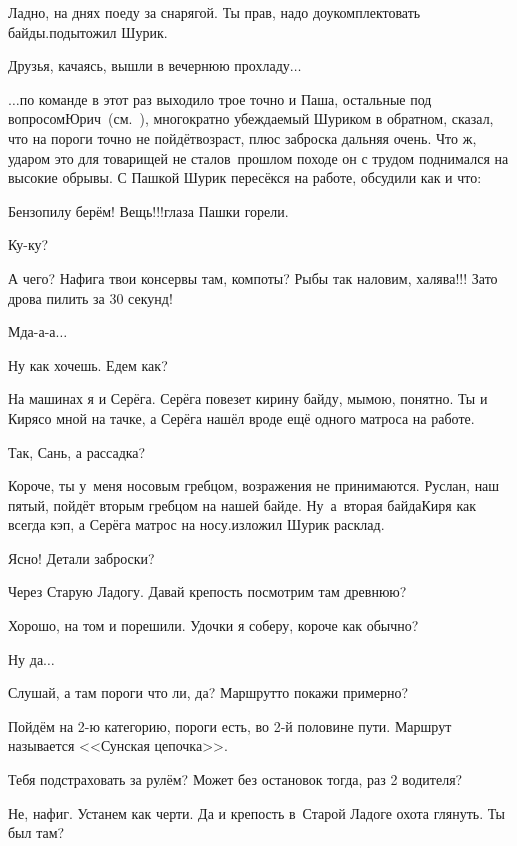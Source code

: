 \diagdash Ладно, на днях поеду за снарягой. Ты прав, надо доукомплектовать байды.\mdash подытожил Шурик.

Друзья, качаясь, вышли в вечернюю прохладу$\ldots$

\vspace{0.5cm}

$\ldots$по команде в этот раз выходило трое точно и Паша, остальные под вопросом\mdash Юрич~(см.~\cite{СоболевВепсскаяЛетопись}), многократно убеждаемый Шуриком в обратном, сказал, что на пороги точно не пойдёт\mdash возраст, плюс заброска дальняя очень. Что ж, ударом это для товарищей не стало\mdash в~прошлом походе он с трудом поднимался на высокие обрывы. С Пашкой Шурик пересёкся на работе, обсудили как и что:

\diagdash Бензопилу берём! Вещь!!!\mdash глаза Пашки горели.

\diagdash Ку-ку?

\diagdash А чего? Нафига твои консервы там, компоты? Рыбы так наловим, халява!!! Зато дрова пилить за 30 секунд!

\diagdash Мда-а-а$\ldots$

\diagdash Ну как хочешь. Едем как?

\diagdash На машинах я и Серёга. Серёга повезет кирину байду, мы\mdash мою, понятно. Ты и Киря\mdash со мной на тачке, а Серёга нашёл вроде ещё одного матроса на работе.

\diagdash Так, Сань, а рассадка?

\diagdash Короче, ты у~меня носовым гребцом, возражения не принимаются. Руслан, наш пятый, пойдёт вторым гребцом на нашей байде. Ну~а~вторая байда\mdash Киря как всегда кэп, а Серёга матрос на носу.\mdash изложил Шурик расклад.

\diagdash Ясно! Детали заброски?

\diagdash Через Старую Ладогу. Давай крепость посмотрим там древнюю?

\diagdash Хорошо, на том и порешили. Удочки я соберу, короче как обычно?

\diagdash Ну да$\ldots$

\diagdash Слушай, а там пороги что ли, да? Маршрут\sdash то покажи примерно?

\diagdash Пойдём на 2-ю категорию, пороги есть, во 2-й половине пути. Маршрут называется <<Сунская цепочка>>.

\diagdash Тебя подстраховать за рулём? Может без остановок тогда, раз 2 водителя?

\diagdash Не, нафиг. Устанем как черти. Да и крепость в~Старой Ладоге охота глянуть. Ты был там?

